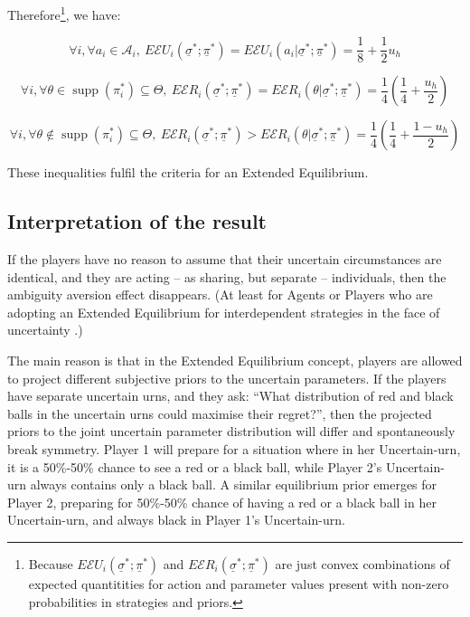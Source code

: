 \documentclass{article}
\theoremstyle{definition}
\DeclareMathOperator\supp{supp}
\begin{document}
Therefore\footnote{Because $E\mathcal{E}U_i(\underline{\sigma}^*;\underline{\pi}^*)$ and $E\mathcal{E}R_i(\underline{\sigma}^*;\underline{\pi}^*)$ are just convex combinations of expected quantitities for action and parameter values present with non-zero probabilities in strategies and priors.}, we have:

\begin{equation}
\forall i, \forall a_i \in \mathcal{A}_i, \  E\mathcal{E}U_i(\underline{\sigma}^*;\underline{\pi}^*) = E\mathcal{E}U_i(a_i | \underline{\sigma}^*;\underline{\pi}^*)
=
\frac{1}{8}+\frac{1}{2} u_h
\end{equation}

\begin{equation}
\label{defeq:ExtendedEquilibriumERSupp}
    \forall i, \forall \theta \in \supp(\pi^*_i) \subseteq \Theta, \  E\mathcal{E}R_i(\underline{\sigma}^*;\underline{\pi}^*) = E\mathcal{E}R_i(\theta | \underline{\sigma}^*;\underline{\pi}^*)
    =
    \frac{1}{4} \left ( \frac{1}{4} + \frac{u_h}{2} \right )
\end{equation}

\begin{equation}
\label{defeq:ExtendedEquilibriumERNotSupp}
    \forall i, \forall \theta \notin \supp(\pi^*_i) \subseteq \Theta, \  E\mathcal{E}R_i(\underline{\sigma}^*;\underline{\pi}^*) > E\mathcal{E}R_i(\theta | \underline{\sigma}^*;\underline{\pi}^*)
    =
    \frac{1}{4} \left ( \frac{1}{4} + \frac{1-u_h}{2} \right )
\end{equation}

These inequalities fulfil the criteria for an Extended Equilibrium.

\subsection{Interpretation of the result}

If the players have no reason to assume that their uncertain circumstances are identical, and they are acting -- as sharing, but separate -- individuals, then the ambiguity aversion effect disappears.
(At least for Agents or Players who are adopting an Extended Equilibrium for interdependent strategies in the face of uncertainty \cite{arxiv:ExtendedEquilibrium}.)

The main reason is that in the Extended Equilibrium concept, players are allowed to project different subjective priors to the uncertain parameters. If the players have separate uncertain urns, and they ask: ``What distribution of red and black balls in the uncertain urns could maximise their regret?'', then the projected priors to the joint uncertain parameter distribution will differ and spontaneously break symmetry.
Player 1 will prepare for a situation where in her Uncertain-urn, it is a 50\%-50\% chance to see a red or a black ball, while Player 2's Uncertain-urn always contains only a black ball.
A similar equilibrium prior emerges for Player 2, preparing for 50\%-50\% chance of having a red or a black ball in her Uncertain-urn, and always black in Player 1's Uncertain-urn.
\end{document}
